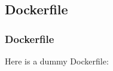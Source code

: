 \documentclass[mathserif,serif]{beamer}
\begin{document}
    \subsection{Dockerfile}\label{subsec:dockerfile}
    \begin{frame}
        \frametitle{Dockerfile}
        Here is a dummy Dockerfile:

        \begin{center}
        \end{center}
    \end{frame}
\end{document}

